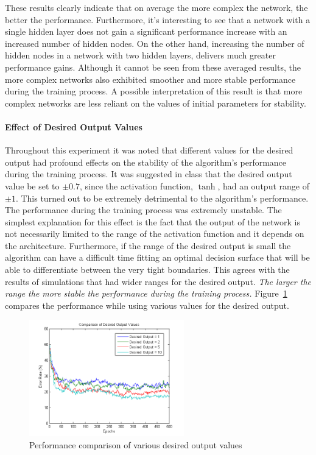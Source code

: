 \documentclass[11pt,letterpaper,titlepage]{article}
\numberwithin{equation}{section}
\numberwithin{figure}{section}
\numberwithin{table}{section}
\begin{document}
These results clearly indicate that on average the more complex the network, the better the performance. Furthermore, it's interesting to see that a network with a single hidden layer does not gain a significant performance increase with an increased number of hidden nodes. On the other hand, increasing the number of hidden nodes in a network with two hidden layers, delivers much greater performance gains. Although it cannot be seen from these averaged results, the more complex networks also exhibited smoother and more stable performance during the training process. A possible interpretation of this result is that more complex networks are less reliant on the values of initial parameters for stability.

\paragraph{Effect of Desired Output Values}
\label{sec:effect-des-out-values}

Throughout this experiment it was noted that different values for the desired output had profound effects on the stability of the algorithm's performance during the training process. It was suggested in class that the desired output value be set to \(\pm 0.7\), since the activation function, \(\tanh\), had an output range of \(\pm 1\). This turned out to be extremely detrimental to the algorithm's performance. The performance during the training process was extremely unstable. The simplest explanation for this effect is the fact that the output of the network is not necessarily limited to the range of the activation function and it depends on the architecture. Furthermore, if the range of the desired output is small the algorithm can have a difficult time fitting an optimal decision surface that will be able to differentiate between the very tight boundaries. This agrees with the results of simulations that had wider ranges for the desired output. \textit{The larger the range the more stable the performance during the training process.} Figure~\ref{fig:mlpekf_desired_output_values} compares the performance while using various values for the desired output.

\begin{figure}[!ht]
  \centering
  \includegraphics[width=0.6\textwidth]{img/mlpekf_desired_output_values}
  \caption{Performance comparison of various desired output values}
  \label{fig:mlpekf_desired_output_values}
\end{figure}
\end{document}
